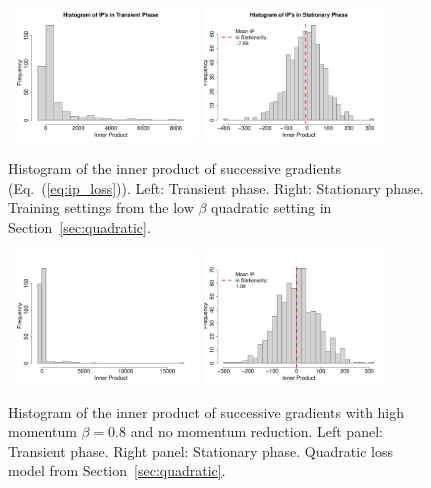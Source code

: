 \documentclass[conference]{IEEEtran}
\begin{document}
\begin{figure}[ht]
\mbox{\hspace{-0.1in}
  \includegraphics[width=1.9in]{fig/HistIPTrans.pdf}\hspace{-0.15in}
  \includegraphics[width=1.9in]{fig/HistIPStat.pdf}
}
\vspace{-0.2in}
  \caption{  Histogram of the inner product of successive gradients (Eq.~(\ref{eq:ip_loss})). 
  Left: Transient phase. 
  Right: Stationary phase.
  Training settings from the low $\beta$ quadratic setting in Section~\ref{sec:quadratic}.
  }
\label{fig:hist_ip}
\end{figure}
\begin{figure}[ht]
\mbox{\hspace{-0.1in}
  \includegraphics[width=1.9in]{fig/HighMomHistIPTrans.pdf}\hspace{-0.15in}
  \includegraphics[width=1.9in]{fig/HighMomHistIPStat.pdf}
}
\vspace{-0.2in}
  \caption{ Histogram of the inner product of successive gradients with high momentum $\beta=0.8$ and no momentum reduction. 
  Left panel: Transient phase. 
  Right panel: Stationary phase.
 Quadratic loss model from Section~\ref{sec:quadratic}.
  }
\label{fig:hist_ip_highmom}
\end{figure}
\end{document}
